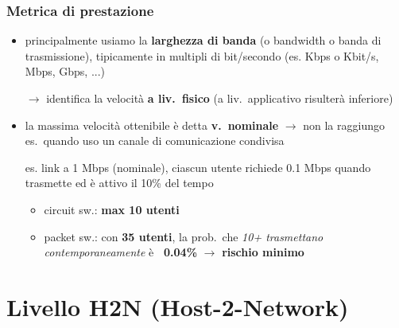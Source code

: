 \subsubsection{Metrica di prestazione}

\begin{itemize}
  \item principalmente usiamo la \textbf{larghezza di banda} (o bandwidth o banda di trasmissione), tipicamente in multipli di bit/secondo (es. Kbps o Kbit/s, Mbps, Gbps, ...)
  \item[$\rightarrow$] identifica la velocit\`a \textbf{a liv.~fisico} (a liv.~applicativo risulter\`a inferiore)
  \item la massima velocit\`a ottenibile \`e detta \textbf{v.~nominale} $\rightarrow$ non la raggiungo es.~quando uso un canale di comunicazione condivisa
  \item[es.] link a 1 Mbps (nominale), ciascun utente richiede 0.1 Mbps quando trasmette ed \`e attivo il 10\% del tempo
  \begin{itemize}
    \item circuit sw.: \textbf{max 10 utenti}
    \item packet sw.: con \textbf{35 utenti}, la prob.~che \textit{10+ trasmettano contemporaneamente} \`e \textbf{~0.04\%} $\rightarrow$ \textbf{rischio minimo}
  \end{itemize}
\end{itemize}

\newpage %

\section{Livello H2N (Host-2-Network)}

